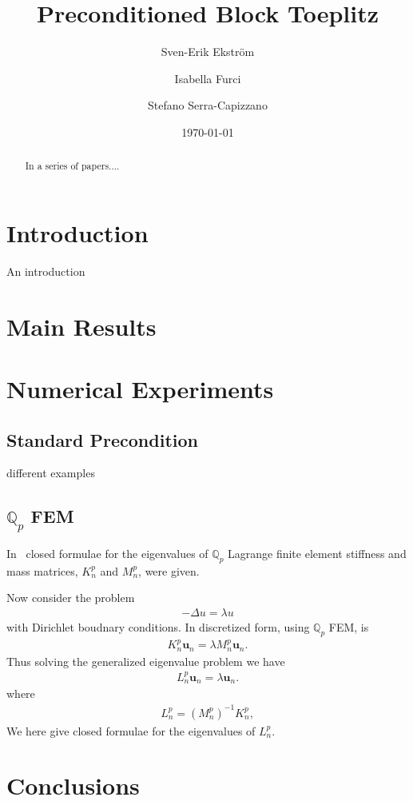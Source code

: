 \documentclass[10pt]{article}
\newcommand{\comm}[1]{{\color{red}{#1}}}
\begin{document}
\title{Preconditioned Block Toeplitz}
\author{Sven-Erik Ekstr\"om         \and
        Isabella Furci \and
        Stefano Serra-Capizzano %
}\date{\today}
\maketitle
\begin{abstract}
In a series of papers....
\end{abstract}
\section{Introduction}
An introduction
\section{Main Results}
\section{Numerical Experiments}
\subsection{Standard Precondition}
 different examples
\subsection{$\mathbb{Q}_p$ FEM}
In~\cite{ekstrom181} closed formulae for the eigenvalues of $\mathbb{Q}_p$ Lagrange finite element stiffness and mass matrices, $K_n^{p}$ and $M_n^{p}$, were given. 


Now consider the problem
\begin{align}
-\Delta u=\lambda u
\end{align}
with Dirichlet boudnary conditions. In discretized form, using $\mathbb{Q}_p$ FEM, is
\begin{align}
K_n^{p}\mathbf{u}_n=\lambda M_n^{p}\mathbf{u}_n.
\end{align}
Thus solving the generalized eigenvalue problem we have
\begin{align}
L_n^{p}\mathbf{u}_n=\lambda \mathbf{u}_n.
\end{align}
where
\begin{align}
L_n^{p}=(M_n^{p})^{-1}K_n^{p},
\end{align}
We here give closed formulae for the eigenvalues of $L_n^{p}$.

\comm{insert correct scalings}

\comm{insert algorithm, see Code/Experiments/newblock.m}
\section{Conclusions}
{}

\end{document}
